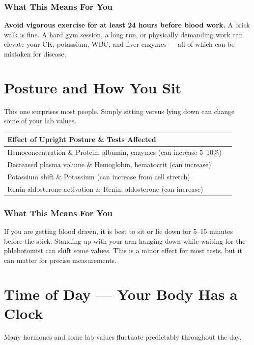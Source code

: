 \subsubsection{What This Means For You}

\textbf{Avoid vigorous exercise for at least 24 hours before blood work.} A brisk walk is fine. A hard gym session, a long run, or physically demanding work can elevate your CK, potassium, WBC, and liver enzymes --- all of which can be mistaken for disease.

\clearpage
\section{Posture and How You Sit}

This one surprises most people. Simply sitting versus lying down can change some of your lab values.

\begin{longtable}{@{}ll@{}}
\toprule
\textbf{Effect of Upright Posture} \& \textbf{Tests Affected} \\
\midrule
Hemoconcentration \& Protein, albumin, enzymes (can increase 5--10\%) \\
Decreased plasma volume \& Hemoglobin, hematocrit (can increase) \\
Potassium shift \& Potassium (can increase from cell stretch) \\
Renin-aldosterone activation \& Renin, aldosterone (can increase) \\
\bottomrule
\end{longtable}

\subsubsection{What This Means For You}

If you are getting blood drawn, it is best to sit or lie down for 5--15 minutes before the stick. Standing up with your arm hanging down while waiting for the phlebotomist can shift some values. This is a minor effect for most tests, but it can matter for precise measurements.

\clearpage
\section{Time of Day --- Your Body Has a Clock}

Many hormones and some lab values fluctuate predictably throughout the day.

